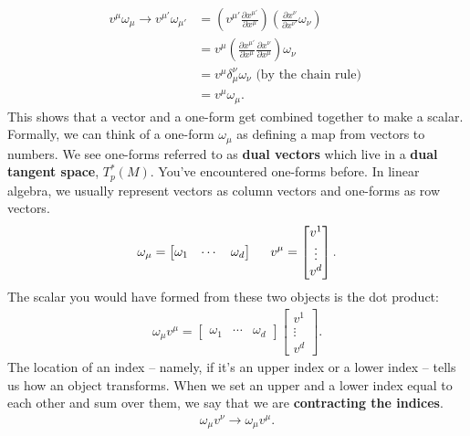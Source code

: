 \documentclass[11pt]{article}
\theoremstyle{definition}
\begin{document}
\begin{align*}
	v^\mu \omega_\mu \rightarrow v^{\mu'}\omega_{\mu'} & = \left( v^{\mu'} \frac{\partial x^{\mu'}}{\partial x^{\mu}} \right) \left( \frac{\partial x^{\nu}}{\partial x^{\nu'}} \omega_{\nu} \right) \\
	& = v^{\mu} \left(\frac{\partial x^{\mu'}}{\partial x^{\mu}} \frac{\partial x^{\nu}}{\partial x^{\mu}}  \right) \omega_{\nu}  \\
	& = v^{\mu} \delta_\mu^\nu \omega_\nu  \text{ (by the chain rule) } \\
	& = v^{\mu}\omega_{\mu}.
\end{align*} 
This shows that a vector and a one-form get combined together to make a scalar.  Formally, we can think of a one-form \( \omega_\mu \) as defining a map from vectors to numbers. We see one-forms referred to as \textbf{dual vectors} which live in a \textbf{dual tangent space}, \( T_p^*(M) \). You've encountered one-forms before. In linear algebra, we usually represent vectors as column vectors and one-forms as row vectors. 
\begin{align*}
	\omega_\mu = \begin{bmatrix}
		\omega_1 & \cdots & \omega_d 
	\end{bmatrix} \hspace{0.5cm} v^\mu = \begin{bmatrix}
		v^1 \\
		\vdots \\
		v^d 
	\end{bmatrix}. 
\end{align*}
The scalar you would have formed from these two objects is the dot product: 
\begin{align*}
	\omega_\mu v^\mu = \begin{bmatrix}
		\omega_1 & \cdots & \omega_d 
	\end{bmatrix} \begin{bmatrix}
		v^1 \\
		\vdots \\
		v^d 
	\end{bmatrix}. 
\end{align*}
The location of an index -- namely, if it's an upper index or a lower index -- tells us how an object transforms. When we set an upper and a lower index equal to each other and sum over them, we say that we are \textbf{contracting the indices}. 
\begin{align*}
	\omega_\mu v^\nu \rightarrow \omega_\mu v^\mu.
\end{align*}
\end{document}
